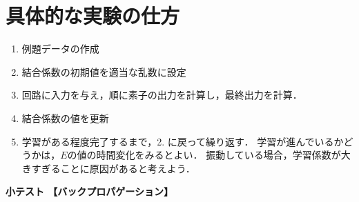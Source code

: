 \documentclass[a4paper,11pt]{jarticle}
\begin{document}
\section{具体的な実験の仕方}
\begin{enumerate}
\item 例題データの作成
 \item 結合係数の初期値を適当な乱数に設定
 \item 回路に入力を与え，順に素子の出力を計算し，最終出力を計算．
 \item 結合係数の値を更新
 \item 学習がある程度完了するまで，2. に戻って繰り返す．
       学習が進んでいるかどうかは，$E$の値の時間変化をみるとよい．
       振動している場合，学習係数が大きすぎることに原因があると考えよう．
\end{enumerate}

\rhead{}




\newpage
%
%
\vspace*{1mm}

\begin{center}
{\large\bf 小テスト 【バックプロパゲーション】}
\end{center}
\end{document}
